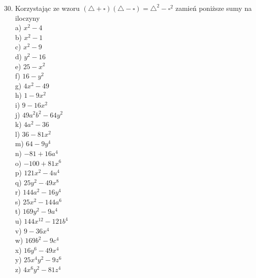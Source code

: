 \documentclass[10pt]{article}
\begin{document}
\begin{enumerate}
  \setcounter{enumi}{29}
  \item Korzystając ze wzoru \((\triangle+\square)(\triangle-\square)=\triangle^{2}-\square^{2}\) zamień poniższe sumy na iloczyny\\
a) \(x^{2}-4\)\\
b) \(x^{2}-1\)\\
c) \(x^{2}-9\)\\
d) \(y^{2}-16\)\\
e) \(25-x^{2}\)\\
f) \(16-y^{2}\)\\
g) \(4 x^{2}-49\)\\
h) \(1-9 x^{2}\)\\
i) \(9-16 x^{2}\)\\
j) \(49 a^{2} b^{2}-64 y^{2}\)\\
k) \(4 a^{2}-36\)\\
l) \(36-81 x^{2}\)\\
m) \(64-9 y^{4}\)\\
n) \(-81+16 a^{4}\)\\
o) \(-100+81 x^{6}\)\\
p) \(121 x^{2}-4 u^{4}\)\\
q) \(25 y^{2}-49 x^{8}\)\\
r) \(144 a^{2}-16 y^{4}\)\\
s) \(25 x^{2}-144 a^{6}\)\\
t) \(169 y^{2}-9 a^{4}\)\\
u) \(144 x^{12}-121 b^{4}\)\\
v) \(9-36 x^{4}\)\\
w) \(169 b^{2}-9 c^{4}\)\\
x) \(16 y^{6}-49 x^{4}\)\\
y) \(25 x^{4} y^{2}-9 z^{6}\)\\
z) \(4 x^{6} y^{2}-81 z^{4}\)
\end{enumerate}
\end{document}
